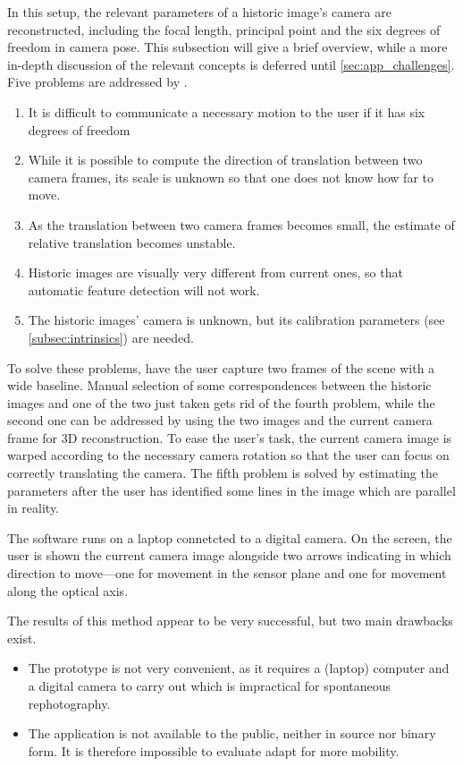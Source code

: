In this setup, the relevant parameters of a historic image's camera are
reconstructed, including the focal length, principal point and the six degrees
of freedom in camera pose. This subsection will give a brief overview,
while a more in-depth discussion of the relevant concepts is deferred until
\autoref{sec:app_challenges}. Five problems are addressed by \citet{bae2010}.
\begin{enumerate}
   \item It is difficult to communicate a necessary motion to the user if it has
      six degrees of freedom 
   \item While it is possible to compute the direction of translation between
      two camera frames, its scale is unknown so that one does not know how far
      to move.
   \item As the translation between two camera frames becomes small, the
      estimate of relative translation becomes unstable.
   \item Historic images are visually very different from current ones, so that
      automatic feature detection will not work.
   \item The historic images' camera is unknown, but its calibration parameters
      (see \autoref{subsec:intrinsics}) are needed.
\end{enumerate}

To solve these problems, \citet{bae2010} have the user capture two frames of the
scene with a wide baseline. Manual selection of some correspondences between the
historic images and one of the two just taken gets rid of the fourth problem,
while the second one can be addressed by using the two images and the current
camera frame for 3D reconstruction. To ease the user's task, the current camera
image is warped according to the necessary camera rotation so that the user can
focus on correctly translating the camera. The fifth problem is solved by
estimating the parameters after the user has identified some lines in the image
which are parallel in reality.

The software runs on a laptop connetcted to a digital camera. On the screen, the
user is shown the current camera image alongside two arrows indicating in which
direction to move---one for movement in the sensor plane and one for movement
along the optical axis.

The results of this method appear to be very successful, but two main drawbacks
exist.
\begin{itemize}
   \item The prototype is not very convenient, as it requires a (laptop)
      computer and a digital camera to carry out which is impractical for
      spontaneous rephotography.
   \item The application is not available to the public, neither in source nor
      binary form. It is therefore impossible to evaluate adapt for more mobility.
\end{itemize}

